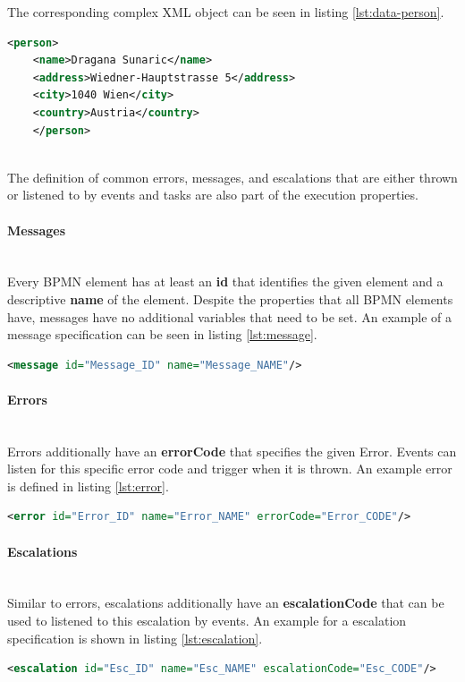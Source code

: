The corresponding complex XML object can be seen in listing \ref{lst:data-person}. 
\begin{lstlisting}[language=xml,caption={An instance of the complex type 'person'},captionpos=b,label={lst:data-person}]
	<person>
	<name>Dragana Sunaric</name>
	<address>Wiedner-Hauptstrasse 5</address>
	<city>1040 Wien</city>
	<country>Austria</country>
	</person>
\end{lstlisting}


~\\The definition of common errors, messages, and escalations that are either thrown or listened to by events and tasks are also part of the execution properties. 
\paragraph{Messages}~\\
Every BPMN element has at least an \textbf{id} that identifies the given element and a descriptive \textbf{name} of the element.\cite{bpmnstandard} Despite the properties that all BPMN elements have, messages have no additional variables that need to be set. An example of a message specification can be seen in listing \ref{lst:message}.
\begin{lstlisting}[language=xml,caption={Example for a message definition},captionpos=b,label={lst:message}]
	<message id="Message_ID" name="Message_NAME"/>
\end{lstlisting}
\paragraph{Errors}~\\
Errors additionally have an \textbf{errorCode} that specifies the given Error. Events can listen for this specific error code and trigger when it is thrown. An example error is defined in listing \ref{lst:error}.\\ 
\begin{lstlisting}[language=xml,caption={Example for a error definition},captionpos=b,label={lst:error}]
	<error id="Error_ID" name="Error_NAME" errorCode="Error_CODE"/>
\end{lstlisting}
\paragraph{Escalations}~\\
Similar to errors, escalations additionally have an \textbf{escalationCode} that can be used to listened to this escalation by events. An example for a escalation specification is shown in listing \ref{lst:escalation}.\\
\begin{lstlisting}[language=xml,caption={Example for a escalation definition},captionpos=b,label={lst:escalation}]
	<escalation id="Esc_ID" name="Esc_NAME" escalationCode="Esc_CODE"/>
\end{lstlisting}

